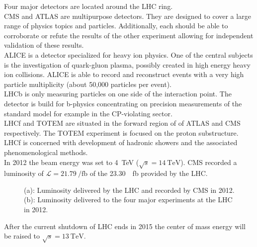 Four major detectors are located around the LHC ring. \\
CMS \cite{cmsTDR1} and ATLAS \cite{AtlasTDR} are multipurpose detectors. They are designed to cover a large range of physics topics and particles. Additionally, each should be able to corroborate or refute the results of the other experiment allowing for independent validation of these results.\\
ALICE \cite{AliceTDR} is a detector specialized for heavy ion physics. One of the central subjects is the investigation of quark-gluon plasma, possibly created in high energy heavy ion collisions. ALICE is able to record and reconstruct events with a very high particle multiplicity (about 50,000 particles per event). \\
LHCb \cite{LHCbTDR} is only measuring particles on one side of the interaction point. The detector is build for b-physics concentrating on precision measurements of the standard model for example in the CP-violating sector.\\
LHCf \cite{LHCfTDR} and TOTEM \cite{TOTEMTDR} are situated in the forward region of of ATLAS and CMS respectively. The TOTEM experiment is focused on the proton substructure. LHCf is concerned with development of hadronic showers and the associated phenomenological methods. \\
In 2012 the beam energy was set to \SI{4}{\tera \electronvolt} ($\sqrt{s} = \SI{14}{\tera \electronvolt}$). CMS recorded a luminosity of $\mathcal{L} = \SI{21.79}{\per \femto \barn}$ of the \SI{23.30}{\per \femto \barn} provided by the LHC. \\

\begin{figure}[ht]
  \caption{(a): Luminosity delivered by the LHC and recorded by CMS in 2012.\cite{lumi_cms} (b): Luminosity delivered to the four major experiments at the LHC in 2012.\cite{lumi_lhc}}
  \label{fig_det_lumi}
\end{figure}

After the current shutdown of LHC ends in 2015 the center of mass energy will be raised to $\sqrt{s} = \SI{13}{\tera \electronvolt}$.

